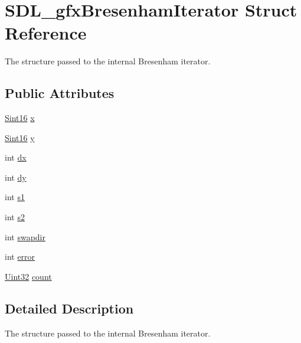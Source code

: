 \hypertarget{struct_s_d_l__gfx_bresenham_iterator}{}\section{S\+D\+L\+\_\+gfx\+Bresenham\+Iterator Struct Reference}
\label{struct_s_d_l__gfx_bresenham_iterator}


The structure passed to the internal Bresenham iterator.  


\subsection*{Public Attributes}
\begin{DoxyCompactItemize}
\item 
\hyperlink{_s_d_l__stdinc_8h_a9d0257032c0e146ab6121bf0122712f5}{Sint16} \hyperlink{struct_s_d_l__gfx_bresenham_iterator_ae7d3bf951ddb6d878dd0d9a9d4c95236}{x}
\item 
\hyperlink{_s_d_l__stdinc_8h_a9d0257032c0e146ab6121bf0122712f5}{Sint16} \hyperlink{struct_s_d_l__gfx_bresenham_iterator_acaea027dd0f03e970c1a9abdc49e080f}{y}
\item 
int \hyperlink{struct_s_d_l__gfx_bresenham_iterator_ab6176f6610660d5f580cb43329417f1d}{dx}
\item 
int \hyperlink{struct_s_d_l__gfx_bresenham_iterator_a8f3193107ce2f1e545ded809201fc4b4}{dy}
\item 
int \hyperlink{struct_s_d_l__gfx_bresenham_iterator_a4d14203012f68bf9349a2c24867f5fb4}{s1}
\item 
int \hyperlink{struct_s_d_l__gfx_bresenham_iterator_af5081fa5126cc88b1add4e9012b5e7cd}{s2}
\item 
int \hyperlink{struct_s_d_l__gfx_bresenham_iterator_ac07c70d86f83b1a63b1ff7e22a1ffc6a}{swapdir}
\item 
int \hyperlink{struct_s_d_l__gfx_bresenham_iterator_a7ee2a7e8e2c02c72c6823f77cbef8e5d}{error}
\item 
\hyperlink{_s_d_l__stdinc_8h_add440eff171ea5f55cb00c4a9ab8672d}{Uint32} \hyperlink{struct_s_d_l__gfx_bresenham_iterator_abe93f64aa99fc869120b7d388a092cb4}{count}
\end{DoxyCompactItemize}


\subsection{Detailed Description}
The structure passed to the internal Bresenham iterator. 

